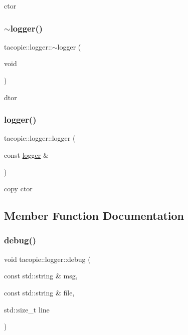 ctor 

\mbox{\label{classtacopie_1_1logger_af5c89b85935dbe3b4da3199247d50398}} 
\subsubsection{\texorpdfstring{$\sim$logger()}{~logger()}}
{\footnotesize\ttfamily tacopie\+::logger\+::$\sim$logger (\begin{DoxyParamCaption}\item[{void}]{ }\end{DoxyParamCaption})\hspace{0.3cm}{\ttfamily [default]}}



dtor 

\mbox{\label{classtacopie_1_1logger_af22e5c126a0e0dbd4c82dc1c40b2d16f}} 
\subsubsection{\texorpdfstring{logger()}{logger()}\hspace{0.1cm}{\footnotesize\ttfamily [2/2]}}
{\footnotesize\ttfamily tacopie\+::logger\+::logger (\begin{DoxyParamCaption}\item[{const \hyperlink{classtacopie_1_1logger}{logger} \&}]{ }\end{DoxyParamCaption})\hspace{0.3cm}{\ttfamily [default]}}



copy ctor 



\subsection{Member Function Documentation}
\mbox{\label{classtacopie_1_1logger_aff31bbc7d3fdbbe60a2331fe24ec76ff}} 
\subsubsection{\texorpdfstring{debug()}{debug()}}
{\footnotesize\ttfamily void tacopie\+::logger\+::debug (\begin{DoxyParamCaption}\item[{const std\+::string \&}]{msg,  }\item[{const std\+::string \&}]{file,  }\item[{std\+::size\+\_\+t}]{line }\end{DoxyParamCaption})\hspace{0.3cm}{\ttfamily [virtual]}}

